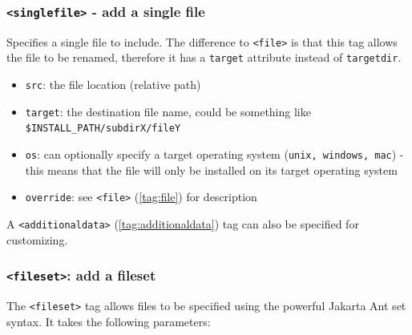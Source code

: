 \subsubsection{\label{tag:singlefile}\texttt{<singlefile>} - add a single file}

Specifies a single file to include. The difference to \texttt{<file>} is that
this tag allows the file to be renamed, therefore it has a 
\texttt{target} attribute instead of \texttt{targetdir}.

\begin{itemize}

  \item \texttt{src}: the file location (relative path)

  \item \texttt{target}: the destination file name, could be something
  like \texttt{\$INSTALL\_PATH/subdirX/fileY}

  \item \texttt{os}: can optionally specify a target operating system
  (\texttt{unix, windows, mac}) - this means that the file will only be
  installed on its target operating system

  \item \texttt{override}: see \texttt{<file>} (\ref{tag:file}) for description

\end{itemize}
A \texttt{<additionaldata>} (\ref{tag:additionaldata}) tag can
also be specified for customizing.

\subsubsection{\label{tag:fileset}\texttt{<fileset>}: add a fileset}

The \texttt{<fileset>} tag allows files to be specified using the powerful
Jakarta Ant set syntax. It takes the following parameters:

